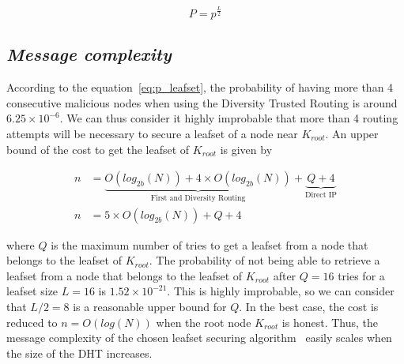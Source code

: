   \begin{equation} \label{eq:p_leafset}
    P= p^{\frac{L}{2}}
  \end{equation}
  
  \subsection{\textit{Message complexity}}

      According to the equation~\eqref{eq:p_leafset}, the probability of having
more than 4 consecutive malicious nodes when using the Diversity Trusted
Routing is around $6.25 \times 10^{-6}$. We can thus consider it highly
improbable that more than 4 routing attempts will be necessary  to secure a
leafset of a node near $K_{root}$. An upper bound of the cost to get the
leafset of $K_{root}$ is given by
      
      \begin{align} \label{eq:p_leafset}
        n &= \underbrace{O(log_{2b}(N)) + 4 \times O(log_{2b}(N))}_\text{First
and Diversity Routing} + \underbrace{Q+4}_\text{Direct IP} \\
        n &= 5 \times O(log_{2b}(N)) +  Q+4 
      \end{align}
      
      where $Q$ is the maximum number of tries to get a leafset from a node
that belongs to the leafset of $K_{root}$. The probability of not being able to
retrieve a leafset from a node that belongs to the leafset of $K_{root}$ after
$Q = 16$ tries for a leafset size $ L = 16$ is $1.52 \times 10^{-21} $. This is
highly improbable, so we can consider that $L/2 = 8$ is a reasonable upper
bound for $Q$. 
      In the best case, the cost is reduced to $n = O(log(N))$ when the root
node $K_{root}$ is honest. Thus, the message complexity of the chosen leafset
securing algorithm~\cite{p2p_certification} easily scales when the size of the
DHT increases.



%

